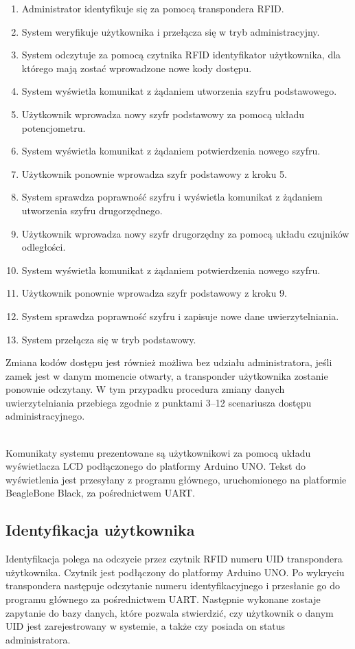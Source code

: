 \documentclass[polish,polish,a4paper]{article}
\begin{document}
	\begin{enumerate}
		\item Administrator identyfikuje się za pomocą transpondera RFID.
		\item System weryfikuje użytkownika i przełącza się w tryb administracyjny.
		\item System odczytuje za pomocą czytnika RFID identyfikator użytkownika, dla którego mają zostać wprowadzone nowe kody dostępu.
		\item System wyświetla komunikat z żądaniem utworzenia szyfru podstawowego.
		\item Użytkownik wprowadza nowy szyfr podstawowy za pomocą układu potencjometru.
		\item System wyświetla komunikat z żądaniem potwierdzenia nowego szyfru.
		\item Użytkownik ponownie wprowadza szyfr podstawowy z kroku 5.
		\item System sprawdza poprawność szyfru i wyświetla komunikat z żądaniem utworzenia szyfru drugorzędnego.
		\item Użytkownik wprowadza nowy szyfr drugorzędny za pomocą układu czujników odległości.
		\item System wyświetla komunikat z żądaniem potwierdzenia nowego szyfru.
		\item Użytkownik ponownie wprowadza szyfr podstawowy z kroku 9.
		\item System sprawdza poprawność szyfru i zapisuje nowe dane uwierzytelniania.
		\item System przełącza się w tryb podstawowy.
	\end{enumerate}
	Zmiana kodów dostępu jest również możliwa bez udziału administratora, jeśli zamek jest w danym momencie otwarty, a transponder użytkownika zostanie ponownie odczytany. W tym przypadku procedura zmiany danych uwierzytelniania przebiega zgodnie z punktami 3--12 scenariusza dostępu administracyjnego.
	
	\noindent\\
	Komunikaty systemu prezentowane są użytkownikowi za pomocą układu wyświetlacza LCD podłączonego do platformy Arduino UNO. Tekst do wyświetlenia jest przesyłany z programu głównego, uruchomionego na platformie BeagleBone Black, za pośrednictwem UART.
	
	\subsection{Identyfikacja użytkownika}
	Identyfikacja polega na odczycie przez czytnik RFID numeru UID transpondera użytkownika. Czytnik jest podłączony do platformy Arduino UNO. Po wykryciu transpondera następuje odczytanie numeru identyfikacyjnego i przesłanie go do programu głównego za pośrednictwem UART. Następnie wykonane zostaje zapytanie do bazy danych, które pozwala stwierdzić, czy użytkownik o danym UID jest zarejestrowany w systemie, a także czy posiada on status administratora.
	
\end{document}
